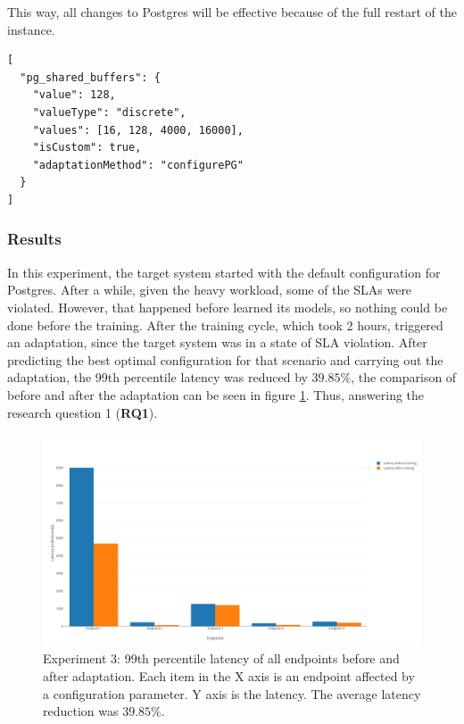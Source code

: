 This way, all changes to Postgres will be effective because of the full restart of the instance.

\begin{lstlisting}[float,floatplacement=H,caption={Example of one of the adaptive configurations used in experiment 3},label={lst:adaptiveconfig1}]
[
  "pg_shared_buffers": {
    "value": 128,
    "valueType": "discrete",
    "values": [16, 128, 4000, 16000],
    "isCustom": true,
    "adaptationMethod": "configurePG"
  }
]
\end{lstlisting}

\subsubsection{Results}

In this experiment, the target system started with the default configuration for Postgres. After a while, given the heavy workload, some of the SLAs were violated. However, that happened before \projectname{} learned its models, so nothing could be done before the training. After the training cycle, which took 2 hours, \projectname{} triggered an adaptation, since the target system was in a state of SLA violation. After predicting the best optimal configuration for that scenario and carrying out the adaptation, the 99th percentile latency was reduced by $39.85\%$, the comparison of before and after the adaptation can be seen in figure \ref{fig:pgexperiment}. Thus, answering the research question 1 (\textbf{RQ1}).

\begin{figure}[!ht]
	\includegraphics[scale=0.15]{images/pgexperiment.png}
  \caption{Experiment 3: 99th percentile latency of all endpoints before and after adaptation. Each item in the X axis is an endpoint affected by a configuration parameter. Y axis is the latency. The average latency reduction was $39.85\%$.}
  \label{fig:pgexperiment}  
\end{figure}

